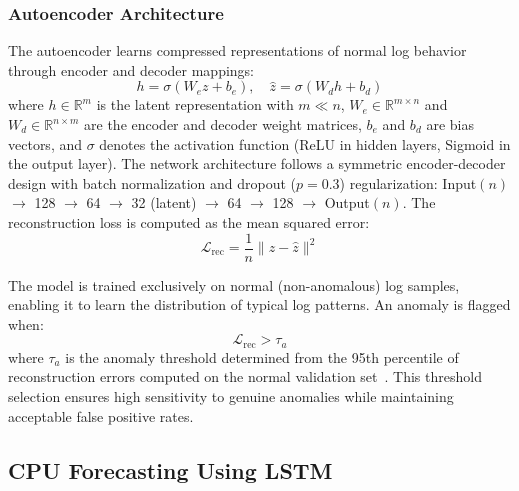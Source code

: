 \documentclass[sn-nature]{sn-jnl}
\theoremstyle{thmstyleone}
\theoremstyle{thmstyletwo}
\theoremstyle{thmstylethree}
\begin{document}
\subsubsection{Autoencoder Architecture}
The autoencoder learns compressed representations of normal log behavior through encoder and decoder mappings:
\begin{equation}
h = \sigma(W_e z + b_e), \quad \hat{z} = \sigma(W_d h + b_d)
\end{equation}
where $h \in \mathbb{R}^m$ is the latent representation with $m \ll n$, $W_e \in \mathbb{R}^{m \times n}$ and $W_d \in \mathbb{R}^{n \times m}$ are the encoder and decoder weight matrices, $b_e$ and $b_d$ are bias vectors, and $\sigma$ denotes the activation function (ReLU in hidden layers, Sigmoid in the output layer).
The network architecture follows a symmetric encoder-decoder design with batch normalization and dropout ($p=0.3$) regularization: Input$(n)$ $\rightarrow$ 128 $\rightarrow$ 64 $\rightarrow$ 32 (latent) $\rightarrow$ 64 $\rightarrow$ 128 $\rightarrow$ Output$(n)$.
The reconstruction loss is computed as the mean squared error:
\begin{equation}
\mathcal{L}_{\mathrm{rec}} = \frac{1}{n}\|z - \hat{z}\|^2
\end{equation}

The model is trained exclusively on normal (non-anomalous) log samples, enabling it to learn the distribution of typical log patterns.
An anomaly is flagged when:
\begin{equation}
\mathcal{L}_{\mathrm{rec}} > \tau_a
\end{equation}
where $\tau_a$ is the anomaly threshold determined from the 95th percentile of reconstruction errors computed on the normal validation set~\cite{sakurada2014anomaly}.
This threshold selection ensures high sensitivity to genuine anomalies while maintaining acceptable false positive rates.

\subsection{CPU Forecasting Using LSTM}\label{subsec:cpuforecast}
\end{document}
